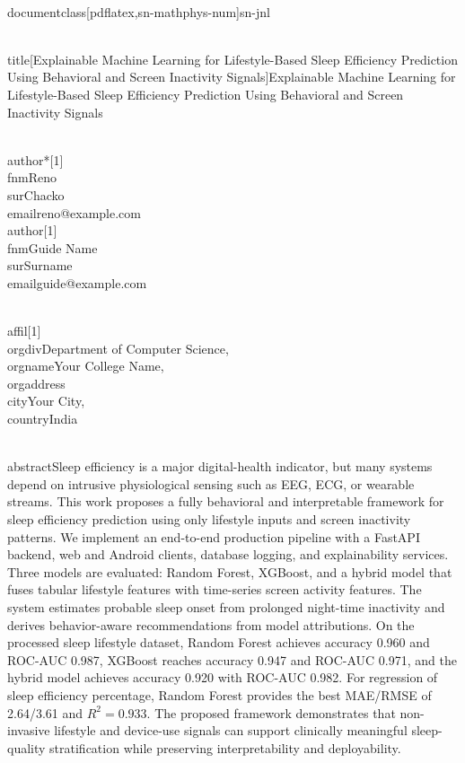 \\documentclass[pdflatex,sn-mathphys-num]{sn-jnl}
\begin{document}
\\title[Explainable Machine Learning for Lifestyle-Based Sleep Efficiency Prediction Using Behavioral and Screen Inactivity Signals]{Explainable Machine Learning for Lifestyle-Based Sleep Efficiency Prediction Using Behavioral and Screen Inactivity Signals}

\\author*[1]{\\fnm{Reno} \\sur{Chacko}}\\email{reno@example.com}
\\author[1]{\\fnm{Guide Name} \\sur{Surname}}\\email{guide@example.com}

\\affil[1]{\\orgdiv{Department of Computer Science}, \\orgname{Your College Name}, \\orgaddress{\\city{Your City}, \\country{India}}}

\\abstract{Sleep efficiency is a major digital-health indicator, but many systems depend on intrusive physiological sensing such as EEG, ECG, or wearable streams. This work proposes a fully behavioral and interpretable framework for sleep efficiency prediction using only lifestyle inputs and screen inactivity patterns. We implement an end-to-end production pipeline with a FastAPI backend, web and Android clients, database logging, and explainability services. Three models are evaluated: Random Forest, XGBoost, and a hybrid model that fuses tabular lifestyle features with time-series screen activity features. The system estimates probable sleep onset from prolonged night-time inactivity and derives behavior-aware recommendations from model attributions. On the processed sleep lifestyle dataset, Random Forest achieves accuracy 0.960 and ROC-AUC 0.987, XGBoost reaches accuracy 0.947 and ROC-AUC 0.971, and the hybrid model achieves accuracy 0.920 with ROC-AUC 0.982. For regression of sleep efficiency percentage, Random Forest provides the best MAE/RMSE of 2.64/3.61 and $R^2=0.933$. The proposed framework demonstrates that non-invasive lifestyle and device-use signals can support clinically meaningful sleep-quality stratification while preserving interpretability and deployability.}
\end{document}
